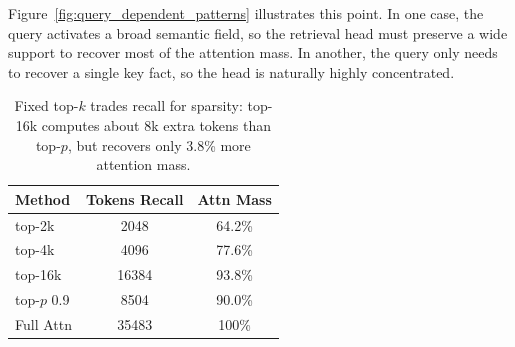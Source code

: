 
Figure~\ref{fig:query_dependent_patterns} illustrates this point. In one case, the query activates a broad semantic field, so the retrieval head must preserve a wide support to recover most of the attention mass. In another, the query only needs to recover a single key fact, so the head is naturally highly concentrated. %

\begin{table}
    \vspace{-1.2em}
    \centering
    \scriptsize
    \setlength{\tabcolsep}{2.2pt}
    \renewcommand{\arraystretch}{0.94}
    \captionsetup{width=\linewidth, justification=raggedright, singlelinecheck=false, skip=2pt}
    \caption{Fixed top-$k$ trades recall for sparsity: top-16k computes about 8k extra tokens than top-$p$, but recovers only 3.8\% more attention mass.}
    \label{tab:topk_topp_inline}
    \begin{tabular*}{\linewidth}{@{\extracolsep{\fill}}lcc@{}}
        \toprule
        \textbf{Method} & \textbf{Tokens Recall} & \textbf{Attn Mass} \\
        \midrule
        top-2k & 2048 & 64.2\% \\
        top-4k & 4096 & 77.6\% \\
        top-16k & 16384 & 93.8\% \\
        top-$p$ 0.9 & 8504 & 90.0\% \\
        Full Attn & 35483 & 100\% \\
        \bottomrule
    \end{tabular*}
    \vspace{-2.0em}
\end{table}

